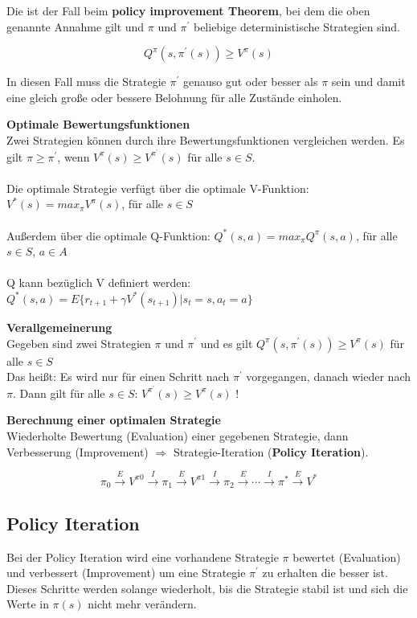 \documentclass[10pt]{scrartcl}
\begin{document}
Die ist der Fall beim \textbf{policy improvement Theorem}, bei dem die oben genannte Annahme gilt und $\pi$ und $\pi^{'}$ beliebige deterministische Strategien sind.

\begin{equation}
Q^{\pi}(s,\pi^{'}(s)) \geq V^{\pi}(s)
\end{equation}

In diesen Fall muss die Strategie $\pi^{'}$ genauso gut oder besser als $\pi$ sein und damit eine gleich große oder bessere Belohnung für alle Zustände einholen.

\textbf{Optimale Bewertungsfunktionen}\\
Zwei Strategien können durch ihre Bewertungsfunktionen vergleichen werden. Es gilt $\pi \geq \pi^{'}$, wenn $V^{\pi}(s)\geq V^{\pi^{'}}(s)$ für alle $s \in S$.\\
\\
Die optimale Strategie verfügt über die optimale V-Funktion:  $V^{*}(s) = max_{\pi} V^{\pi}(s)$, für alle $s \in S$\\
\\
Außerdem über die optimale Q-Funktion: $Q^{*}(s,a) =  max_{\pi} Q^{\pi}(s,a)$, für alle $s \in S$, $a \in A$\\
\\
Q kann bezüglich V definiert werden: $Q^{*}(s,a) = E \{r_{t+1}+ \gamma V^{*}(s_{t+1}) | s_{t}=s ,a_{t}=a \}$

\textbf{Verallgemeinerung}\\
Gegeben sind zwei Strategien $\pi$ und $\pi^{'}$ und es gilt $Q^{\pi}(s,\pi^{'}(s)) \geq V^{\pi}(s)$ für alle $s \in S$\\
Das heißt: Es wird nur für einen Schritt nach  $\pi^{'}$ vorgegangen, danach wieder nach  $\pi$. Dann gilt für alle $s \in S$: $V^{\pi^{'}}(s) \geq V^{\pi}(s)$ !

\textbf{Berechnung einer optimalen Strategie}\\
Wiederholte Bewertung (Evaluation) einer gegebenen Strategie, dann Verbesserung (Improvement) $\Rightarrow$ Strategie-Iteration (\textbf{Policy Iteration}).

\begin{equation}
\pi_{0} \overset{E}\rightarrow V^{\pi 0} \overset{I}\rightarrow \pi_{1} \overset{E}\rightarrow V^{\pi 1} \overset{I}\rightarrow \pi_{2} \overset{E}\rightarrow \dotsb \overset{I}\rightarrow \pi^{*} \overset{E}\rightarrow V^{*}
\end{equation}

\subsection{Policy Iteration}
Bei der Policy Iteration wird eine vorhandene Strategie $\pi$ bewertet (Evaluation) und verbessert (Improvement) um eine Strategie $\pi^{'}$ zu erhalten die besser ist. Dieses Schritte werden solange wiederholt, bis die Strategie stabil  ist und sich die Werte in $\pi(s)$ nicht mehr verändern.
\end{document}
